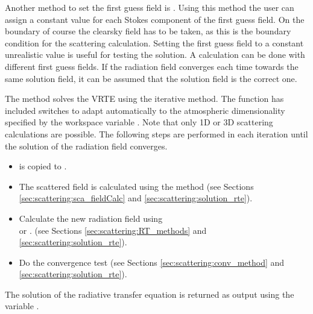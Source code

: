 \vspace*{1ex} Another method to set the first guess field is
. Using this method the user can assign a
constant value for each Stokes component of the first guess field. On
the boundary of course the clearsky field has to be taken, as this is
the boundary condition for the scattering calculation.  Setting the
first guess field to a constant unrealistic value is useful for
testing the solution. A calculation can be done with different first
guess fields. If the radiation field converges each time towards the
same solution field, it can be assumed that the solution field is the
correct one.


The method  solves the VRTE using the
iterative method.  The function has included switches to adapt
automatically to the atmospheric dimensionality specified by the
workspace variable . Note that only 1D or 3D
scattering calculations are possible.  The following steps are
performed in each iteration until the solution of the radiation field
converges.

\begin{itemize}
\item {} is copied to .
\item The scattered field is calculated using the method
   (see Sections
  \ref{sec:scattering:sca_fieldCalc} and
  \ref{sec:scattering:solution_rte}).
\item Calculate the new radiation field using\\
   or .  (see
  Sections \ref{sec:scattering:RT_methods} and
  \ref{sec:scattering:solution_rte}).
\item Do the convergence test (see Sections
  \ref{sec:scattering:conv_method} and
  \ref{sec:scattering:solution_rte}).
\end{itemize}
The solution of the radiative transfer equation is returned as output
using the variable .


